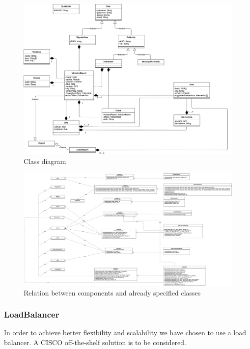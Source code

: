\begin{figure}[h!]
	\centering
	\includegraphics[angle=90, scale=0.40]{Images/ADV_class_diagram}
	\caption{Class diagram}
\end{figure}
\newpage

\begin{figure}[h!]
	\centering
	\includegraphics[angle=90, scale=0.25]{Images/component_class_relation}
	\caption{Relation between components and already specified classes}
\end{figure}
\newpage
\subsubsection{LoadBalancer}
In order to achieve better flexibility and scalability we have chosen to use a load balancer. A CISCO off-the-shelf solution is to be considered.

